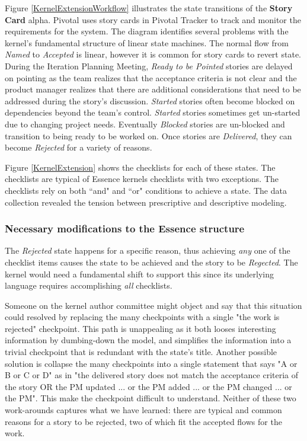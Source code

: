 \documentclass[preprint,12pt,3p]{elsarticle}
\begin{document}
{Figure \ref{KernelExtensionWorkflow} illustrates the state transitions of the \textbf{Story Card} alpha. Pivotal uses story cards in Pivotal Tracker to track and monitor the requirements for the system. The diagram identifies several problems with the kernel's fundamental structure of linear state machines. The normal flow from \textit{Named} to \textit{Accepted} is linear, however it is common for story cards to revert state. During the Iteration Planning Meeting, \textit{Ready to be Pointed} stories are delayed on pointing as the team realizes that the acceptance criteria is not clear and the product manager realizes that there are additional considerations that need to be addressed during the story's discussion.  \textit{Started} stories often become blocked on dependencies beyond the team's control.  \textit{Started} stories sometimes get un-started due to changing project needs. Eventually \textit{Blocked} stories are un-blocked and transition to being ready to be worked on. Once stories are \textit{Delivered}, they can become \textit{Rejected} for a variety of 
reasons.

Figure \ref{KernelExtension} shows the checklists for each of these states. The checklists are typical of Essence kernels checklists with two exceptions. The checklists rely on both ``and" and  ``or" conditions to achieve a state. The data collection revealed the tension between prescriptive and descriptive modeling.

\subsubsection{Necessary modifications to the Essence structure}

The \textit{Rejected} state happens for a specific reason, thus achieving \textit{any} one of the checklist items causes the state to be achieved and the story to be \textit{Regected}. The kernel would need a fundamental shift to support this since its underlying language requires accomplishing \textit{all} checklists. 

Someone on the kernel author committee might object and say that this situation could resolved by replacing the many checkpoints with a single "the work is rejected" checkpoint. This path is unappealing as it both looses interesting information by dumbing-down the model, and simplifies the information into a trivial checkpoint that is redundant with the state's title. Another possible solution is collapse the many checkpoints into a single statement that says "A or B or C or D" as in "the delivered story does not match the acceptance criteria of the story OR the PM updated ... or the PM added ... or the PM changed ... or the PM". This make the checkpoint difficult to understand. Neither of these two work-arounds captures what we have learned: there are typical and common reasons for a story to be rejected, two of which fit the accepted flows for the work. 

}
\end{document}
